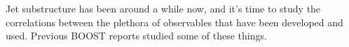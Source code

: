 Jet substructure has been around a while now, and it's time to study the correlations between the plethora of observables that have been developed and used.  Previous BOOST reports \cite{Abdesselam:2010pt,Altheimer:2012mn,Altheimer:2013yza} studied some of these things.
